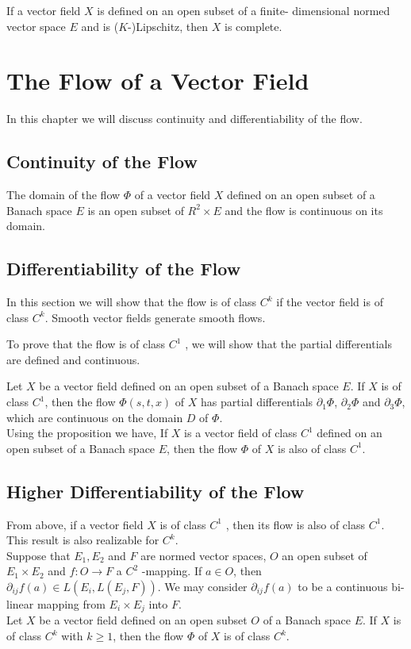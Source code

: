\documentclass[12 pt]{article}
\theoremstyle{definition}
\theoremstyle{remark}
\begin{document}
{\theorem If a vector field $X$ is defined on an open subset of a finite-
dimensional normed vector space $E$ and is ($K$-)Lipschitz, then $X$ is complete.


\newpage
\normalfont
\section{The Flow of a Vector Field}
In this chapter we will discuss continuity and differentiability of the flow.
\subsection{Continuity of the Flow}
\theorem The domain of the flow $\Phi$ of a vector field $X$ defined on an open
subset of a Banach space $E$ is an open subset of $R^2 \times E$ and the flow is continuous on its domain.
\subsection{Differentiability of the Flow}
\normalfont
In this section we will show that the flow is of class $C^k$ if the vector field is of class $C^k$. Smooth vector fields generate smooth flows.

To prove that the flow is of class $C^1$ , we will show that the partial differentials are defined and continuous.

\proposition Let $X$ be a vector field defined on an open subset of a Banach
space $E$. If $X$ is of class $C^1$, then the flow $\Phi (s,t,x)$ of $X$ has partial differentials $\partial_1 \Phi$, $\partial_2 \Phi$ and $\partial_3 \Phi$, which are continuous on the domain $D$ of $\Phi$.\\

\normalfont
Using the proposition we have,
\theorem If $X$ is a vector field of class $C^1$ defined on an open subset of a
Banach space $E$, then the flow $\Phi$ of $X$ is also of class $C^1$.
\normalfont
\subsection{Higher Differentiability of the Flow}
From above, if a vector field $X$ is of class $C^1$ , then its flow is also of class $C^1$. This result is also realizable for $C^k$.\\

Suppose that $E_1 , E_2$ and $F$ are normed vector spaces, $O$ an open subset of $E_1 \times E_2$ and $f : O \to F$ a $C^2$ -mapping. If $a \in O$, then $\partial_{ij} f(a) \in  L(E_i,  L(E_j, F))$. We
may consider $\partial_{ij} f(a)$  to be a continuous bi-linear mapping from $E_i \times E_j$ into $F$.\\
\theorem Let $X$ be a vector field defined on an open subset $O$ of a Banach
space $E$. If $X$ is of class $C^k$ with $k \geq 1$, then the flow $\Phi$ of $X$ is of class $C^k$.\\ \normalfont
\newpage
}
\end{document}
